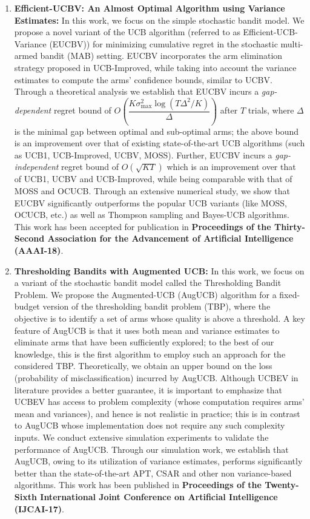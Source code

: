 \documentclass[twoside]{article}
\begin{document}
\begin{enumerate}
\item \textbf{Efficient-UCBV: An Almost Optimal Algorithm using Variance Estimates:} In this work, we focus on the simple stochastic bandit model. We propose a novel variant of the UCB algorithm (referred to as Efficient-UCB-Variance (EUCBV)) for minimizing cumulative regret in the stochastic multi-armed bandit (MAB) setting. EUCBV incorporates the arm elimination strategy proposed in UCB-Improved, while taking into account the variance estimates to compute the arms' confidence bounds, similar to UCBV. Through a theoretical analysis we establish that EUCBV incurs a \emph{gap-dependent} regret bound of  $O\left( \dfrac{K\sigma^2_{\max} \log (T\Delta^2 /K)}{\Delta}\right)$ after $T$ trials, where $\Delta$ is the minimal gap between optimal and sub-optimal arms; the above bound is an improvement over that of existing state-of-the-art UCB algorithms (such as UCB1, UCB-Improved, UCBV,  MOSS). Further, EUCBV incurs a \emph{gap-independent} regret bound of {\scriptsize $O\left(\sqrt{KT}\right)$}  which is an improvement over that of UCB1, UCBV and UCB-Improved, while being comparable with that of MOSS and OCUCB. Through an extensive numerical study, we show that EUCBV significantly outperforms the popular UCB variants (like MOSS, OCUCB, etc.) as well as Thompson sampling and Bayes-UCB algorithms. This work has been accepted for publication in \textbf{Proceedings of the Thirty-Second Association for the Advancement of Artificial Intelligence (AAAI-18)}.

\item \textbf{Thresholding Bandits with Augmented UCB:} In this work, we focus on a variant of the stochastic bandit model called the Thresholding Bandit Problem. We propose the Augmented-UCB (AugUCB) algorithm for a fixed-budget version of the thresholding bandit problem (TBP), where the objective is to identify a set of arms whose quality is above a threshold. A key feature of AugUCB is that it uses both mean and variance estimates to eliminate arms that have been sufficiently explored; to the best of our knowledge, this is the first algorithm to employ such an approach for the considered TBP.  Theoretically, we obtain an upper bound on the loss (probability of misclassification) incurred by AugUCB. Although UCBEV in literature provides a better guarantee, it is important to emphasize that UCBEV has access to problem complexity (whose computation requires arms' mean and variances), and hence is not realistic in practice; this is in contrast to AugUCB whose implementation does not require any such complexity inputs. We conduct extensive simulation experiments to validate the performance of AugUCB. Through our simulation work, we establish that AugUCB, owing to its utilization of variance estimates, performs significantly better than the state-of-the-art APT, CSAR and other non variance-based algorithms. This work has been published in \textbf{Proceedings of the Twenty-Sixth International Joint Conference on Artificial Intelligence (IJCAI-17)}.
\end{enumerate}
\end{document}
